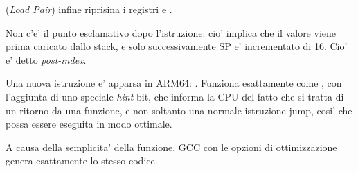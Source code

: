  (\emph{Load Pair}) infine riprisina i registri  e .

Non c'e' il punto esclamativo dopo l'istruzione: cio' implica che il valore viene prima caricato dallo stack, e solo successivamente 
\ac{SP} e' incrementato di 16.
Cio' e' detto \emph{post-index}.

Una nuova istruzione e' apparsa in ARM64: \RET. 
Funziona esattamente come , con l'aggiunta di uno speciale \emph{hint} bit, che informa la \ac{CPU}
del fatto che si tratta di un ritorno da una funzione, e non soltanto una normale istruzione jump, cosi' che possa 
essere eseguita in modo ottimale.

A causa della semplicita' della funzione, GCC con le opzioni di ottimizzazione genera esattamente lo stesso codice.
